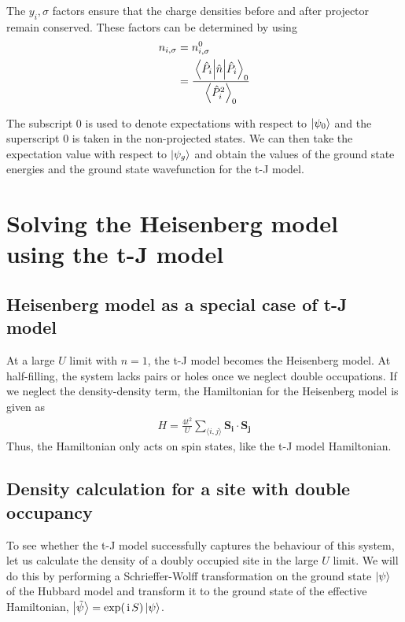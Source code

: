 \documentclass[]{report}
\renewcommand{\vec}{\bm}
\newcommand{\I}{\,\mathrm{i}\,}
\begin{document}
The $ y_i,\sigma $ factors ensure that the charge densities before and after projector remain conserved. These factors can be determined by using
\begin{align}
\nonumber
n_{i, \sigma}
&=
n^{0}_{i, \sigma}\\
\nonumber
&=
\frac{ \expval{\hat{n}}{\hat{P}_{i}}_{0} }{ \expval{\hat{P}^{2}_{i}}_0 }
\end{align}

The subscript 0 is used to denote expectations with respect to $ 
\ket{\psi_0} $ and the superscript 0 is taken in the non-projected states. We can then take the expectation value with respect to $ \ket{\psi_g} $ and obtain the values of the ground state energies and the ground state wavefunction for the t-J model.


\chapter{Solving the Heisenberg model using the t-J model}
\section{Heisenberg model as a special case of t-J model}
At a large $ U $ limit with $ n = 1 $, the t-J model becomes the Heisenberg model. At half-filling, the system lacks pairs or holes once we neglect double occupations. If we neglect the density-density term, the Hamiltonian for the Heisenberg model is given as
\begin{align}
H = \frac{4t^2}{U} \sum_{\langle i,j \rangle} \vec{S_{i}} \cdot \vec{S_{j}}
\end{align}
Thus, the Hamiltonian only acts on spin states, like the t-J model Hamiltonian.

\section{Density calculation for a site with double occupancy}
To see whether the t-J model successfully captures the behaviour of this system, let us calculate the density of a doubly occupied site in the large $ U $ limit. We will do this by performing a Schrieffer-Wolff transformation on the ground state $ \ket{\psi} $ of the Hubbard model and transform it to the ground state of the effective Hamiltonian, $ \ket{\tilde{\psi}} = \exp(\I S) \ket{\psi} $.
\end{document}
